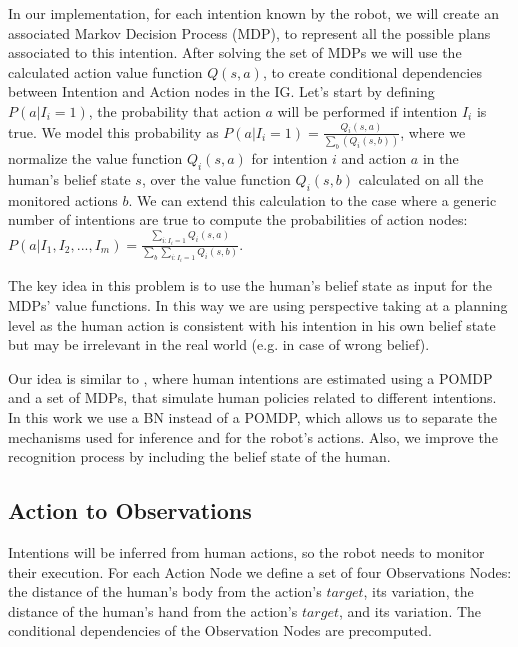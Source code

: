 In our implementation, for each intention known by the robot, we will create an associated Markov Decision Process (MDP), to represent all the possible plans associated to this intention. After solving the set of MDPs we will use the calculated action value function \(Q(s,a)\), to create conditional dependencies between Intention and Action nodes in the IG. Let's start by defining \(P(a|I_i=1)\), the probability that action $a$ will be performed if intention $I_i$ is true. We model this probability as \(P(a|I_i=1)=\frac{Q_i(s,a)}{\sum_b(Q_i(s,b))}\), where we normalize the value function $Q_i(s,a)$ for intention $i$ and action $a$ in the human's belief state $s$, over the value function $Q_i(s,b)$ calculated on all the monitored actions $b$. We can extend this calculation to the case where a generic number of intentions are true to compute the probabilities of action nodes: \(P(a|I_1,I_2,...,I_m)=\frac{\sum_{i:I_i=1}Q_i(s,a)}{\sum_b\sum_{i:I_i=1}Q_i(s,b)}\).

The key idea in this problem is to use the human's belief state as input for the MDPs' value functions. In this way we are using perspective taking at a planning level as the human action is consistent with his intention in his own belief state but may be irrelevant in the real world (e.g. in case of wrong belief).

Our idea is similar to \cite{karami2010human}, where human intentions are estimated using a POMDP and a set of MDPs, that simulate human policies related to different intentions. In this work we use a BN instead of a POMDP, which allows us to separate the mechanisms used for inference and for the robot's actions. Also, we improve the recognition process by including the belief state of the human.

\subsection{Action to Observations}
Intentions will be inferred from human actions, so the robot needs to monitor their execution. For each Action Node we define a set of four Observations Nodes: the distance of the human's body from the action's $target$, its variation, the distance of the human's hand from the action's $target$, and its variation. The conditional dependencies of the Observation Nodes are precomputed.

